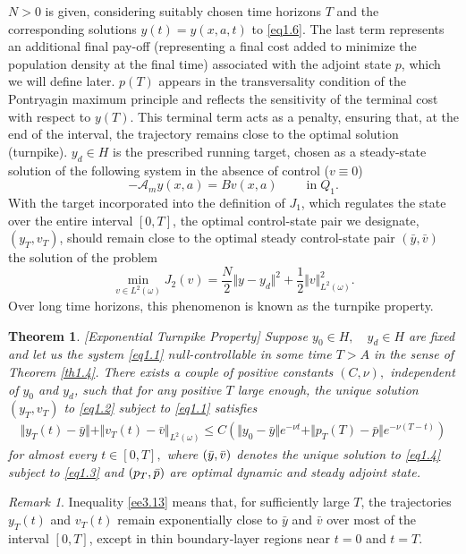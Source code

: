\documentclass[10pt, a4]{amsart}
\theoremstyle{plain}
\newtheorem{theorem}[lemma]{Theorem}
\theoremstyle{definition}
\theoremstyle{remark}
\newtheorem{remark}[lemma]{Remark}
\numberwithin{equation}{section}
\begin{document}
 $N>0$ is given, considering suitably chosen time horizons \(T\) and the corresponding solutions $y(t)=y(x,a,t)$ to \eqref{eq1.6}. The last term represents an additional final pay-off (representing a final cost added to minimize the population density at the final time) associated with the adjoint state \(p \), which we will define later.  \( p(T) \) appears in the transversality condition of the Pontryagin maximum principle and reflects the sensitivity of the terminal cost with respect to \( y(T) \). This terminal term acts as a penalty, ensuring that, at the end of the interval, the trajectory remains close to the optimal solution (turnpike).  $y_d\in H$ is the prescribed running target, chosen as a steady-state solution of the following system in the absence of control (\( v \equiv 0 \))
\begin{equation}\label{eq1.3}	 
-\mathcal{A}_my(x,a)=Bv(x,a)  \qquad\;\text{in}\;Q_1.
\end{equation}
With the target incorporated into the definition of \(J_1\), which regulates the state over the entire interval \([0,T]\), the optimal control-state pair we designate, \((y_T, v_T)\), should remain close to the optimal steady control-state pair \((\bar{y}, \bar{v})\) the solution of the problem
\begin{equation}\label{eq1.4}
 \min\limits_{v\in L^2(\omega)}J_2(v)=\dfrac{N}{2}\Vert y-y_d\Vert^2+\dfrac{1}{2}\Vert v\Vert^2_{L^2(\omega)}.
 \end{equation}
Over long time horizons, this phenomenon is known as the turnpike property.
\begin{theorem}\label{th1.5}[Exponential Turnpike Property]
Suppose $y_0\in H,\quad y_d\in H$ are fixed and  let us the system \eqref{eq1.1}   null-controllable in some time $T> A$ in the sense of Theorem \ref{th1.4}. There exists a couple of positive constants  $(C,\nu),$  independent of $y_0$ and $y_d$, such that for any positive $T$ large enough, the unique solution  $(y_T,v_T)$  to \eqref{eq1.2} subject to \eqref{eq1.1}   satisfies 
\begin{align}\label{ee3.13}
\Vert y_T(t)-\bar{y}\Vert+\Vert v_T(t)-\bar{v}\Vert_{L^2(\omega)}\leq C\left(\Vert y_0 -\bar{y}\Vert e^{-\nu t}+\Vert p_T(T)-\bar{p}\Vert e^{-\nu (T-t)}\right)
\end{align}
for almost every  $t\in [0,T],$ where $(\Bar{y},\Bar{v})$ denotes the unique solution to  \eqref{eq1.4} subject to \eqref{eq1.3} and $(p_T,\Bar{p})$ are optimal dynamic and steady adjoint state.
\end{theorem} 
\begin{remark}
 Inequality \eqref{ee3.13} means that, for sufficiently large $T$, the trajectories $y_T(t)$ and $v_T(t)$ remain exponentially close to $\bar y$ and $\bar v$ over most of the interval $[0,T]$, except in thin boundary‐layer regions near $t=0$ and $t=T$.
\end{remark}
\end{document}
